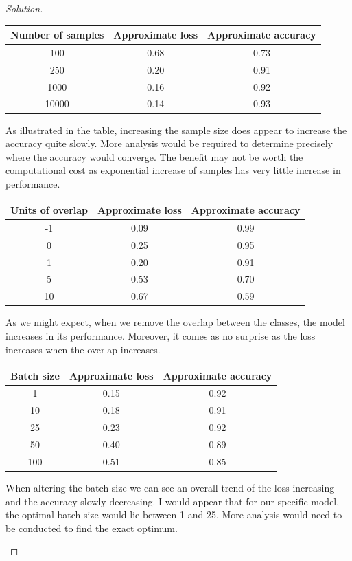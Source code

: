 \documentclass[ 12pt ]{article}
\begin{document}
\begin{enumerate}
\begin{proof}[Solution]
\begin{enumerate}
\begin{center}
					\begin{tabular}{|c|c|c|}
						\hline
						Number of samples & Approximate loss & Approximate accuracy \\
						\hline
						100 & 0.68 & 0.73 \\
						250 & 0.20 & 0.91 \\
						1000 & 0.16 & 0.92 \\
						10000 & 0.14 & 0.93 \\
						\hline
					\end{tabular}
					\end{center}
					As illustrated in the table, increasing the sample size does appear to increase the accuracy quite slowly. More analysis would be required to determine precisely
					where the accuracy would converge. The benefit may not be worth the computational cost as exponential increase of samples has very little increase in performance.
					\begin{center}
					\begin{tabular}{|c|c|c|}
						\hline
						Units of overlap & Approximate loss & Approximate accuracy \\
						\hline
						-1 & 0.09 & 0.99 \\
						0 & 0.25 & 0.95 \\
						1 & 0.20 & 0.91 \\
						5 & 0.53 & 0.70 \\
						10 & 0.67 & 0.59 \\
						\hline
					\end{tabular}
					\end{center}
					As we might expect, when we remove the overlap between the classes, the model increases in its performance. Moreover, it comes as no surprise as the loss increases
					when the overlap increases.
					\begin{center}
					\begin{tabular}{|c|c|c|}
						\hline
						Batch size & Approximate loss & Approximate accuracy \\
						\hline
						1 & 0.15 & 0.92 \\
						10 & 0.18 & 0.91 \\
						25 & 0.23 & 0.92 \\
						50 & 0.40 & 0.89 \\
						100 & 0.51 & 0.85 \\
						\hline
					\end{tabular}
					\end{center}
					When altering the batch size we can see an overall trend of the loss increasing and the accuracy slowly decreasing. I would appear that for our specific model, the
					optimal batch size would lie between 1 and 25. More analysis would need to be conducted to find the exact optimum.
			\end{enumerate}
		\end{proof}
\end{enumerate}
\end{document}
